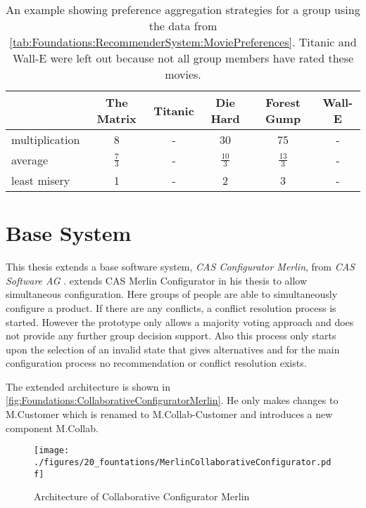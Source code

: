 \begin{table}
    \centering    
    \begin{tabular}{ l | c | c | c | c | c }
        & The Matrix & Titanic & Die Hard & Forest Gump & Wall-E \\ \hline
         multiplication  & 8 & - & 30 & 75 & - \\
         average  & $\frac{7}{3}$ & - & $\frac{10}{3}$ & $\frac{13}{3}$ & - \\
         least misery  & 1 & - & 2 & 3 & - \\
    \end{tabular}
    \caption[Movies: Result Matrix for Group Aggregation Strategies]{An example showing preference aggregation strategies for a group using the data from \autoref{tab:Foundations:RecommenderSystem:MoviePreferences}. Titanic and Wall-E were left out because not all group members have rated these movies.}
    
    \label{tab:Foundations:RecommenderSystem:AggregationStrategy}
\end{table}


\section{Base System}
\label{sec:Foundations:BaseSystem}

This thesis extends a base software system, \emph{CAS Configurator Merlin}, from \emph{CAS Software AG} \cite{CASSoftwareAG}. \citeauthor{raabKollaborativeProduktkonfigurationEchtzeit2019} \cite{raabKollaborativeProduktkonfigurationEchtzeit2019} extends CAS Merlin Configurator in his thesis to allow simultaneous configuration. Here groups of people are able to simultaneously configure a product. If there are any conflicts, a conflict resolution process is started. However the prototype only allows a majority voting approach and does not provide any further group decision support. Also this process only starts upon the selection of an invalid state that gives alternatives and for the main configuration process no recommendation or conflict resolution exists.

The extended architecture is shown in \autoref{fig:Foundations:CollaborativeConfiguratorMerlin}.
He only makes changes to M.Customer which is renamed to M.Collab-Customer and introduces a new component M.Collab.

\begin{figure}
    \centering
    \texttt{[image: ./figures/20\_fountations/MerlinCollaborativeConfigurator.pdf]}
    \caption[Architecture: Collaborative Configurator]{Architecture of Collaborative Configurator Merlin \cite[Fig. 4.3]{raabKollaborativeProduktkonfigurationEchtzeit2019}}
    \label{fig:Foundations:CollaborativeConfiguratorMerlin}
\end{figure}

